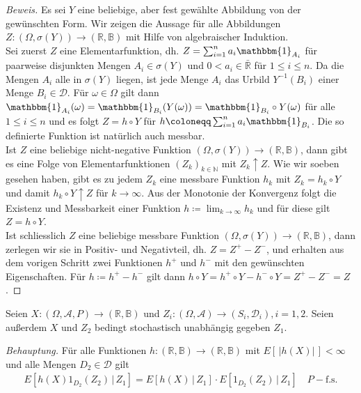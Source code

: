 \documentclass[10pt]{article}
\newcommand{\R}{\mathbb{R}}
\newcommand{\A}{\mathcal{A}}
\newcommand{\D}{\mathcal{D}}
\newcommand{\B}{\mathbb{B}}
\newcommand{\gap}{\,\vert\,}
\newcommand{\beh}{\textit{Behauptung. }}
\newenvironment{Aufgabe}[2][Aufgabe]{\begin{trivlist}
\item[\hskip \labelsep {\bfseries #1}\hskip \labelsep {\bfseries #2.}]}{\end{trivlist}}
\begin{document}
\begin{proof}[Beweis]
	Es sei $Y$ eine beliebige, aber fest gewählte Abbildung von der gewünschten Form. Wir zeigen die Aussage für alle Abbildungen $Z:(\Omega, \sigma(Y)) \rightarrow (\mathbb{R}, \mathbb{B})$ mit Hilfe von algebraischer Induktion. \\

	Sei zuerst $Z$ eine Elementarfunktion, dh. $Z = \sum_{i=1}^n a_i \mathbbm{1}_{A_i}$ für paarweise disjunkten Mengen $A_i \in \sigma(Y)$ und $0 < a_i \in \bar{\mathbb{R}}$ für $1 \leq i \leq n$. 
	Da die Mengen $A_i$ alle in $\sigma(Y)$ liegen, ist jede Menge $A_i$ das Urbild $Y^{-1}(B_i)$ einer Menge $B_i \in \mathcal{D}$. Für $\omega \in \Omega$ gilt dann $\mathbbm{1}_{A_i}(\omega) = \mathbbm{1}_{B_i}(Y(\omega)) = \mathbbm{1}_{B_i} \circ Y (\omega)$
	für alle $1 \leq i \leq n$ und es folgt $Z = h \circ Y$ für $h \coloneqq \sum_{i=1}^n a_i \mathbbm{1}_{B_i}$. Die so definierte Funktion ist natürlich auch messbar. \\

	Ist $Z$ eine beliebige nicht-negative Funktion $(\Omega, \sigma(Y)) \rightarrow (\mathbb{R}, \mathbb{B})$, dann gibt es eine Folge von Elementarfunktionen $(Z_k)_{k \in \mathbb{N}}$  mit $Z_k \uparrow Z$. Wie wir soeben gesehen haben, gibt es zu jedem $Z_k$ eine 	messbare Funktion $h_k$ mit $Z_k = h_k \circ Y$ und damit $h_k \circ Y \uparrow Z$ für $k \to \infty$. Aus der Monotonie der Konvergenz folgt die Existenz und Messbarkeit einer Funktion $h \coloneqq \lim_{k \to \infty} h_k$ und für diese gilt $Z = h \circ Y$. \\

	Ist schliesslich $Z$ eine beliebige messbare Funktion $(\Omega, \sigma(Y)) \rightarrow (\mathbb{R}, \mathbb{B})$, dann zerlegen wir sie in Positiv- und Negativteil, dh. $Z = Z^+ - Z^-$, und erhalten aus dem vorigen Schritt zwei Funktionen $h^+$ und $h^-$ mit den
	gewünschten Eigenschaften. Für $h \coloneqq h^+ - h^-$ gilt dann $h \circ Y = h^+\circ Y - h^-\circ Y = Z^+ - Z^- = Z$.  
\end{proof}

\begin{Aufgabe}{3} %
	Seien $X : (\Omega, \A, P)\to (\R, \B)$ und $Z_i : (\Omega, \A)\to (S_i, \D_i), i = 1,2$. Seien außerdem $X$ und $Z_2$
	bedingt stochastisch unabhängig gegeben $Z_1$.
\end{Aufgabe}

\beh Für alle Funktionen $h: (\R,\B)\to (\R,\B)$ mit $E[\,\vert h(X) \vert\,] < \infty$ und alle Mengen $D_2\in\D$ gilt 
	\begin{align*}
		E[h(X)1_{D_2}(Z_2) \,\vert\, Z_1] = E[h(X) \,\vert\, Z_1] \cdot E[1_{D_2}(Z_2) \gap Z_1] \quad\text{$P-$f.s.}
	\end{align*}
\end{document}
